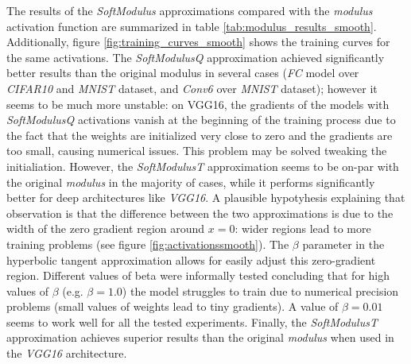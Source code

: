 The results of the \textit{SoftModulus} approximations compared with the \textit{modulus} activation function are summarized in table \ref{tab:modulus_results_smooth}. Additionally, figure \ref{fig:training_curves_smooth} shows the training curves for the same activations. The \textit{SoftModulusQ} approximation achieved significantly better results than the original modulus in several cases (\textit{FC} model over \textit{CIFAR10} and \textit{MNIST} dataset, and \textit{Conv6} over \textit{MNIST} dataset); however it seems to be much more unstable: on VGG16, the gradients of the models with \textit{SoftModulusQ} activations vanish at the beginning of the training process due to the fact that the weights are initialized very close to zero and the gradients are too small, causing numerical issues. This problem may be solved tweaking the initialiation. However, the \textit{SoftModulusT} approximation seems to be on-par with the original \textit{modulus} in the majority of cases, while it performs significantly better for deep architectures like \textit{VGG16}. A plausible hypotyhesis explaining that observation is  that the difference between the two approximations is due to the width of the zero gradient region around $x=0$: wider regions lead to more training problems (see figure \ref{fig:activationssmooth}). The $\beta$ parameter in the hyperbolic tangent approximation allows for easily adjust this zero-gradient region. Different values of beta were informally tested concluding that for high values of $\beta$ (e.g. $\beta=1.0$) the model struggles to train due to numerical precision problems (small values of weights lead to tiny gradients). A value of $\beta=0.01$ seems to work well for all the tested experiments. Finally, the \textit{SoftModulusT} approximation achieves superior results than the original \textit{modulus} when used in the \textit{VGG16} architecture.


